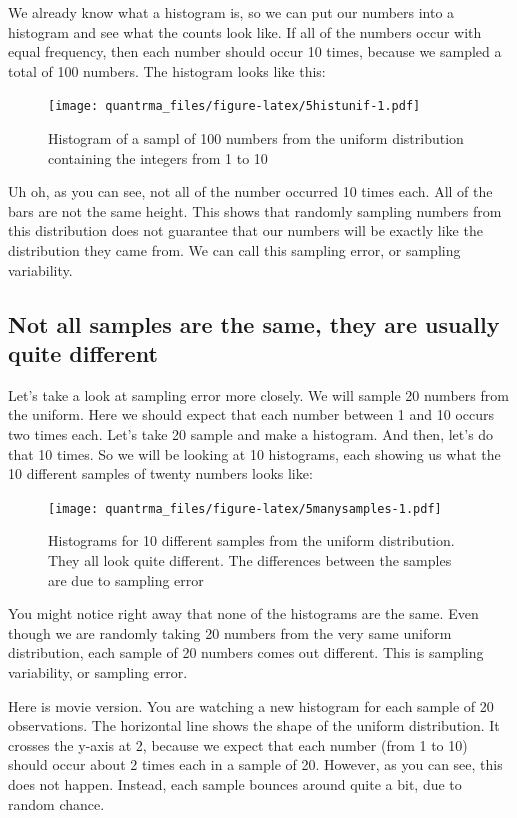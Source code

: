 \documentclass[
]{book}
\begin{document}
We already know what a histogram is, so we can put our numbers into a histogram and see what the counts look like. If all of the numbers occur with equal frequency, then each number should occur 10 times, because we sampled a total of 100 numbers. The histogram looks like this:

\begin{figure}
\centering
\texttt{[image: quantrma\_files/figure-latex/5histunif-1.pdf]}
\caption{\label{fig:5histunif}Histogram of a sampl of 100 numbers from the uniform distribution containing the integers from 1 to 10}
\end{figure}

Uh oh, as you can see, not all of the number occurred 10 times each. All of the bars are not the same height. This shows that randomly sampling numbers from this distribution does not guarantee that our numbers will be exactly like the distribution they came from. We can call this sampling error, or sampling variability.

\hypertarget{not-all-samples-are-the-same-they-are-usually-quite-different}{%
\subsection{Not all samples are the same, they are usually quite different}\label{not-all-samples-are-the-same-they-are-usually-quite-different}}

Let's take a look at sampling error more closely. We will sample 20 numbers from the uniform. Here we should expect that each number between 1 and 10 occurs two times each. Let's take 20 sample and make a histogram. And then, let's do that 10 times. So we will be looking at 10 histograms, each showing us what the 10 different samples of twenty numbers looks like:

\begin{figure}
\centering
\texttt{[image: quantrma\_files/figure-latex/5manysamples-1.pdf]}
\caption{\label{fig:5manysamples}Histograms for 10 different samples from the uniform distribution. They all look quite different. The differences between the samples are due to sampling error}
\end{figure}

You might notice right away that none of the histograms are the same. Even though we are randomly taking 20 numbers from the very same uniform distribution, each sample of 20 numbers comes out different. This is sampling variability, or sampling error.

Here is movie version. You are watching a new histogram for each sample of 20 observations. The horizontal line shows the shape of the uniform distribution. It crosses the y-axis at 2, because we expect that each number (from 1 to 10) should occur about 2 times each in a sample of 20. However, as you can see, this does not happen. Instead, each sample bounces around quite a bit, due to random chance.
\end{document}
